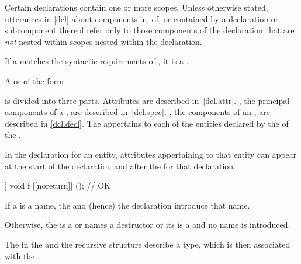\pnum
{}%
%
Certain declarations contain one or more scopes.
Unless otherwise stated, utterances in
\ref{dcl} about components in, of, or contained by a
declaration or subcomponent thereof refer only to those components of
the declaration that are \emph{not} nested within scopes nested within
the declaration.

\pnum
If a  matches
the syntactic requirements of ,
it is a .

\pnum
A
 or
 of the form
\begin{ncsimplebnf}
   \terminal{;}
\end{ncsimplebnf}
is divided into three parts.
Attributes are described in~\ref{dcl.attr}.
, the principal components of
a , are described in~\ref{dcl.spec}.
, the components of an
, are described in \ref{dcl.decl}.
The 
appertains to each of the entities declared by
the 
of the .
\begin{note}
In the declaration for an entity, attributes appertaining to that
entity can appear at the start of the declaration and after the
 for that declaration.
\end{note}
\begin{example}
\begin{codeblock}
[[noreturn]] void f [[noreturn]] ();    // OK
\end{codeblock}
\end{example}

\pnum
If a  is a name, the
 and (hence) the declaration introduce that name.
\begin{note}
Otherwise, the  is
a  or
names a destructor or
its  is a  and
no name is introduced.
\end{note}
The  in
the  and
the recursive  structure
describe a type,
which is then associated with the .

